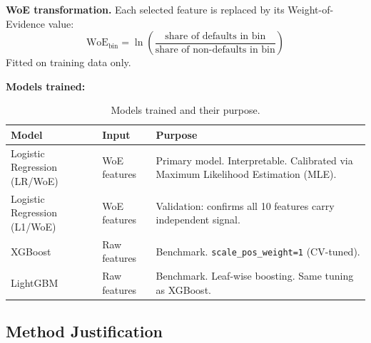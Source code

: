 \documentclass[a4paper,11pt]{article}
\begin{document}
\textbf{WoE transformation.} Each selected feature is replaced by its
Weight-of-Evidence value:
\[
  \text{WoE}_{\text{bin}} = \ln\!\left(\frac{\text{share of defaults in bin}}
                                             {\text{share of non-defaults in bin}}\right)
\]
Fitted on training data only.

\textbf{Models trained:}

\begin{table}[H]
\centering
\begin{tabular}{L{4.5cm} L{2.5cm} L{7.5cm}}
\toprule
\textbf{Model} & \textbf{Input} & \textbf{Purpose} \\
\midrule
Logistic Regression (LR/WoE) & WoE features & Primary model. Interpretable. Calibrated via Maximum Likelihood Estimation (MLE). \\
Logistic Regression (L1/WoE) & WoE features & Validation: confirms all 10 features carry independent signal. \\
XGBoost                      & Raw features & Benchmark. \texttt{scale\_pos\_weight=1} (CV-tuned). \\
LightGBM                     & Raw features & Benchmark. Leaf-wise boosting. Same tuning as XGBoost. \\
\bottomrule
\end{tabular}
\caption{Models trained and their purpose.}
\end{table}

\subsection{Method Justification}
\end{document}

